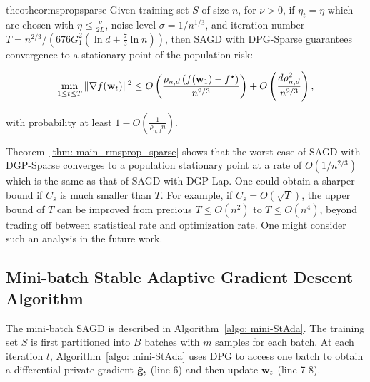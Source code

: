 \documentclass[11pt]{article}
\begin{document}
\begin{restatable}{theo}{theormspropsparse}
\label{thm: main_rmsprop_sparse}
 Given training set $S$ of size $n$, for $\nu >0$, if $\eta_t = \eta$ which are chosen with $\eta \leq \frac{\nu}{2L}$, noise level $\sigma = 1/n^{1/3}$, and iteration number $T = n^{2/3}/\left(676G_1^2(\ln d + \frac{7}{3}\ln n)\right)$, then \textsc{SAGD} with DPG-Sparse  guarantees convergence to a stationary point of the population risk:
  \begin{small}
\begin{equation*}
 \min_{1\leq t\leq T}\|\nabla f(\mathbf{w}_t)\|^2 \leq
 O \left( \frac{\rho_{n,d} \left(f(\mathbf{w}_1) - f^\star \right)}{n^{2/3}} \right) + O \left( \frac{d \rho_{n,d}^2}{n^{2/3}}\right),
\end{equation*}
\end{small}
with probability at least $1-O\left(\frac{1}{\rho_{n,d} n}\right)$.
\end{restatable} 


Theorem~\ref{thm: main_rmsprop_sparse} shows that the worst case of \textsc{SAGD} with DGP-Sparse converges to a population stationary point at a rate of $O(1/n^{2/3})$ which is the same as that of \textsc{SAGD} with DGP-Lap. One could obtain a sharper bound if $C_{s}$ is much smaller than $T$. For example, if $C_{s} = O(\sqrt{T})$, the upper bound of $T$ can be improved from precious $T \leq O(n^2)$ to $T \leq O(n^4)$, beyond trading off between statistical rate and optimization rate. One might consider such an analysis in the future work.



\subsection{Mini-batch Stable Adaptive Gradient Descent Algorithm}
\label{mini-batch algorithm}

The mini-batch \textsc{SAGD} is described in Algorithm~\ref{algo: mini-StAda}. The training set $S$ is first partitioned
into $B$ batches with $m$ samples for each batch. At each iteration $t$, Algorithm~\ref{algo: mini-StAda} uses DPG to access one batch to obtain a differential private gradient $\tilde {\mathbf{g}}_t$ (line 6) and then update $\mathbf{w}_t$ (line 7-8). 
\end{document}
